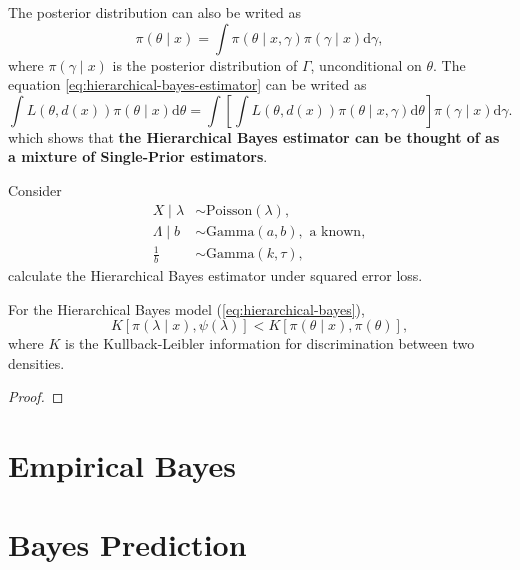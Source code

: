 \begin{note}
    The posterior distribution can also be writed as
    \begin{equation*}
        \pi\left(\theta\mid x\right)=\int\pi\left(\theta\mid x,\gamma\right)\pi\left(\gamma\mid x\right)\mathrm{d}\gamma,
    \end{equation*}
    where $\pi\left(\gamma\mid x\right)$ is the posterior distribution of $\Gamma$, unconditional on $\theta$. The equation \ref{eq:hierarchical-bayes-estimator} can be writed as
    \begin{equation*}
        \int L\left(\theta,d\left(x\right)\right)\pi\left(\theta\mid x\right)\mathrm{d}\theta = \int\left[\int L\left(\theta,d\left(x\right)\right)\pi\left(\theta\mid x,\gamma\right)\mathrm{d}\theta\right]\pi\left(\gamma\mid x\right)\mathrm{d}\gamma.
    \end{equation*}
    which shows that \textbf{the Hierarchical Bayes estimator can be thought of as a mixture of Single-Prior estimators}.
\end{note}

\begin{example}
    Consider
    \begin{equation}
        \begin{aligned}
            X\mid\lambda &\sim \text{Poisson}\left(\lambda\right),\\
            \Lambda\mid b &\sim \text{Gamma}\left(a,b\right), \text{ a known},\\
            \frac{1}{b} &\sim \text{Gamma}\left(k,\tau\right),
        \end{aligned}
    \end{equation}
    calculate the Hierarchical Bayes estimator under squared error loss.
\end{example}


\begin{theorem}{}{}
    For the Hierarchical Bayes model (\ref{eq:hierarchical-bayes}),
    \begin{equation}
        K\left[\pi\left(\lambda\mid x\right),\psi\left(\lambda\right)\right] < K\left[\pi\left(\theta\mid x\right),\pi\left(\theta\right)\right],
    \end{equation}
    where $K$ is the Kullback-Leibler information for discrimination between two densities.
\end{theorem}

\begin{proof}
    
\end{proof}

\begin{note}
    
\end{note}

\section{Empirical Bayes}

\section{Bayes Prediction}